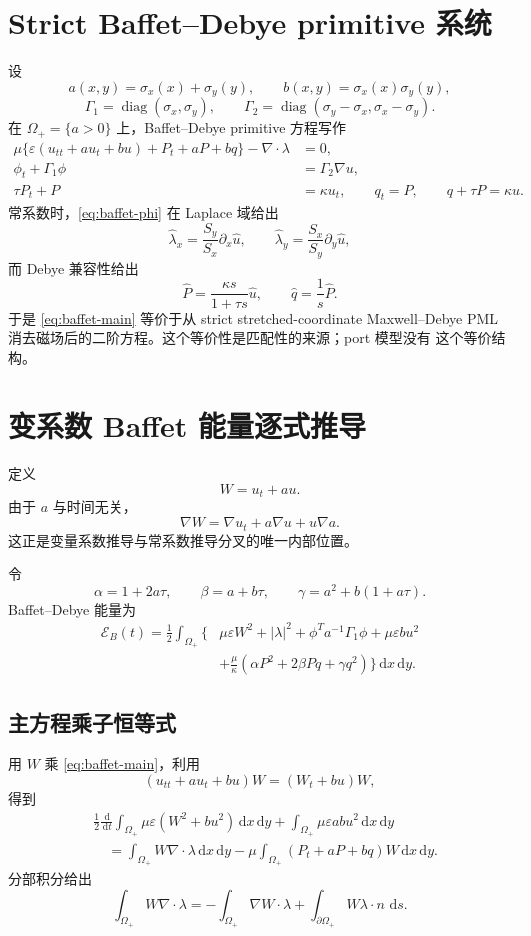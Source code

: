 \documentclass[UTF8,a4paper,11pt]{ctexart}
\newcommand{\dd}{\,\mathrm d}
\newcommand{\sx}{\sigma_x}
\newcommand{\sy}{\sigma_y}
\newcommand{\Ecal}{\mathcal E}
\newcommand{\eps}{\varepsilon}
\newcommand{\diag}{\operatorname{diag}}
\begin{document}
\section{Strict Baffet--Debye primitive 系统}

设
\[
a(x,y)=\sx(x)+\sy(y),\qquad b(x,y)=\sx(x)\sy(y),
\]
\[
\Gamma_1=\diag(\sx,\sy),\qquad
\Gamma_2=\diag(\sy-\sx,\sx-\sy).
\]
在 \(\Omega_+=\{a>0\}\) 上，Baffet--Debye primitive 方程写作
\begin{align}
\mu\{\eps(u_{tt}+a u_t+b u)+P_t+aP+bq\}-\nabla\cdot\lambda&=0,
\label{eq:baffet-main}\\
\phi_t+\Gamma_1\phi&=\Gamma_2\nabla u,\label{eq:baffet-phi}\\
\tau P_t+P&=\kappa u_t,\qquad q_t=P,\qquad q+\tau P=\kappa u.
\label{eq:baffet-debye}
\end{align}
常系数时，\eqref{eq:baffet-phi} 在 Laplace 域给出
\[
\widehat\lambda_x=\frac{S_y}{S_x}\partial_x\widehat u,\qquad
\widehat\lambda_y=\frac{S_x}{S_y}\partial_y\widehat u,
\]
而 Debye 兼容性给出
\[
\widehat P=\frac{\kappa s}{1+\tau s}\widehat u,\qquad \widehat q=\frac1s\widehat P.
\]
于是 \eqref{eq:baffet-main} 等价于从 strict stretched-coordinate
Maxwell--Debye PML 消去磁场后的二阶方程。这个等价性是匹配性的来源；port 模型没有
这个等价结构。

\section{变系数 Baffet 能量逐式推导}

定义
\[
W=u_t+a u.
\]
由于 \(a\) 与时间无关，
\[
\nabla W=\nabla u_t+a\nabla u+u\nabla a.
\]
这正是变量系数推导与常系数推导分叉的唯一内部位置。

令
\[
\alpha=1+2a\tau,\qquad \beta=a+b\tau,\qquad
\gamma=a^2+b(1+a\tau).
\]
Baffet--Debye 能量为
\begin{equation}
\begin{aligned}
\Ecal_B(t)=\frac12\int_{\Omega_+}\{&
\mu\eps W^2+|\lambda|^2+\phi^T a^{-1}\Gamma_1\phi+\mu\eps b u^2\\
&+\frac{\mu}{\kappa}(\alpha P^2+2\beta Pq+\gamma q^2)\}\dd x\dd y.
\end{aligned}
\label{eq:EB}
\end{equation}

\subsection{主方程乘子恒等式}

用 \(W\) 乘 \eqref{eq:baffet-main}，利用
\[
(u_{tt}+a u_t+b u)W=(W_t+b u)W,
\]
得到
\[
\begin{aligned}
&\frac12\frac{\dd}{\dd t}\int_{\Omega_+}\mu\eps(W^2+b u^2)\dd x\dd y
+\int_{\Omega_+}\mu\eps a b u^2\dd x\dd y\\
&\quad=\int_{\Omega_+}W\nabla\cdot\lambda\dd x\dd y
-\mu\int_{\Omega_+}(P_t+aP+bq)W\dd x\dd y .
\end{aligned}
\]
分部积分给出
\[
\int_{\Omega_+}W\nabla\cdot\lambda
=-\int_{\Omega_+}\nabla W\cdot\lambda
+\int_{\partial\Omega_+}W\lambda\cdot n\,\dd s.
\]
\end{document}
